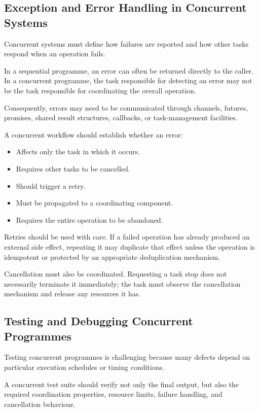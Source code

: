 \subsection{Exception and Error Handling in Concurrent Systems}

Concurrent systems must define how failures are reported and how other tasks respond when an operation fails.

In a sequential programme, an error can often be returned directly to the caller. In a concurrent programme, the task responsible for detecting an error may not be the task responsible for coordinating the overall operation.

Consequently, errors may need to be communicated through channels, futures, promises, shared result structures, callbacks, or task-management facilities.

A concurrent workflow should establish whether an error:

\begin{itemize}
    \item Affects only the task in which it occurs.
    \item Requires other tasks to be cancelled.
    \item Should trigger a retry.
    \item Must be propagated to a coordinating component.
    \item Requires the entire operation to be abandoned.
\end{itemize}

Retries should be used with care. If a failed operation has already produced an external side effect, repeating it may duplicate that effect unless the operation is idempotent or protected by an appropriate deduplication mechanism.

Cancellation must also be coordinated. Requesting a task stop does not necessarily terminate it immediately; the task must observe the cancellation mechanism and release any resources it has.

\subsection{Testing and Debugging Concurrent Programmes}

Testing concurrent programmes is challenging because many defects depend on particular execution schedules or timing conditions.

A concurrent test suite should verify not only the final output, but also the required coordination properties, resource limits, failure handling, and cancellation behaviour.

